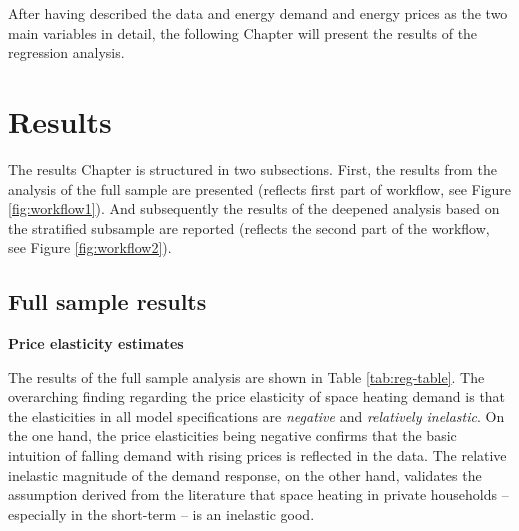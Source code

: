 \documentclass[12pt,twoside]{reedthesis}
\begin{document}
After having described the data and energy demand and energy prices as the two main variables in detail, the following Chapter will present the results of the regression analysis.

\hypertarget{results}{%
\chapter{Results}\label{results}}

The results Chapter is structured in two subsections. First, the results from the analysis of the full sample are presented (reflects first part of workflow, see Figure \ref{fig:workflow1}). And subsequently the results of the deepened analysis based on the stratified subsample are reported (reflects the second part of the workflow, see Figure \ref{fig:workflow2}).

\hypertarget{full_sample_results}{%
\section{Full sample results}\label{full_sample_results}}

\textbf{Price elasticity estimates}

The results of the full sample analysis are shown in Table \ref{tab:reg-table}. The overarching finding regarding the price elasticity of space heating demand is that the elasticities in all model specifications are \emph{negative} and \emph{relatively inelastic}. On the one hand, the price elasticities being negative confirms that the basic intuition of falling demand with rising prices is reflected in the data. The relative inelastic magnitude of the demand response, on the other hand, validates the assumption derived from the literature that space heating in private households -- especially in the short-term -- is an inelastic good.
\end{document}
